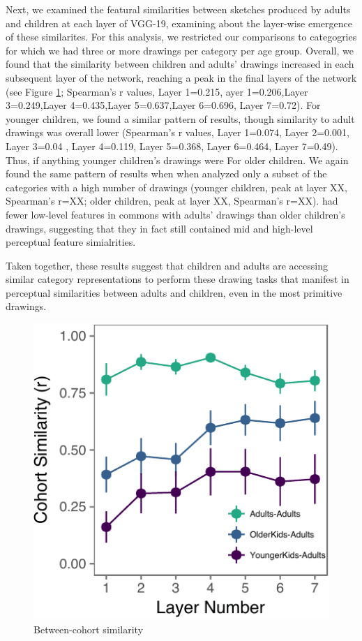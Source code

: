 \documentclass[10pt, letterpaper]{article}
\newenvironment{CodeChunk}{}{}
\begin{document}
Next, we examined the featural similarities between sketches produced by
adults and children at each layer of VGG-19, examining about the
layer-wise emergence of these similarites. For this analysis, we
restricted our comparisons to categogries for which we had three or more
drawings per category per age group. Overall, we found that the
similarity between children and adults' drawings increased in each
subsequent layer of the network, reaching a peak in the final layers of
the network (see Figure \ref{fig:layerWise}; Spearman's r values, Layer
1=0.215, ayer 1=0.206,Layer 3=0.249,Layer 4=0.435,Layer 5=0.637,Layer
6=0.696, Layer 7=0.72). For younger children, we found a similar pattern
of results, though similarity to adult drawings was overall lower
(Spearman's r values, Layer 1=0.074, Layer 2=0.001, Layer 3=0.04 , Layer
4=0.119, Layer 5=0.368, Layer 6=0.464, Layer 7=0.49). Thus, if anything
younger children's drawings were For older children. We again found the
same pattern of results when when analyzed only a subset of the
categories with a high number of drawings (younger children, peak at
layer XX, Spearman's r=XX; older children, peak at layer XX, Spearman's
r=XX). had fewer low-level features in commons with adults' drawings
than older children's drawings, suggesting that they in fact still
contained mid and high-level perceptual feature simialrities.

Taken together, these results suggest that children and adults are
accessing similar category representations to perform these drawing
tasks that manifest in perceptual similarities between adults and
children, even in the most primitive drawings.

\begin{CodeChunk}
\begin{figure}[H]

{\centering \includegraphics{figs/layerWise-1} 

}

\caption[Between-cohort similarity ]{Between-cohort similarity }\label{fig:layerWise}
\end{figure}
\end{CodeChunk}
\end{document}
